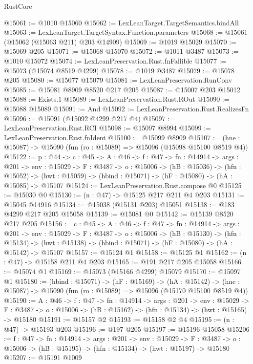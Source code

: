 \begin{lexlean}{RustCore}
\begin{coremodule}
@15061 := @1010 @15060
@15062 := LexLeanTarget.TargetSemantics.bindAll
@15063 := LexLeanTarget.TargetSyntax.Function.parameters
@15068 := @15061 (@15062 (@15063 @211) @203 @14909)
@15069 := @1019 @15029
@15070 := @15069 @205
@15071 := @15068 @15070
@15072 := @1011 @3487
@15073 := @1010 @15072
@15074 := LexLeanPreservation.Rust.fnFallible
@15077 := @15073 (@15074 @8519 @4299)
@15078 := @1019 @3487
@15079 := @15078 @205
@15080 := @15077 @15079
@15081 := LexLeanPreservation.RunConv
@15085 := @15081 @8909 @8520 @217 @205
@15087 := @15007 @203 @15012
@15088 := Exists.{1}
@15089 := LexLeanPreservation.Rust.ROut
@15090 := @15088 @15089
@15091 := And
@15092 := LexLeanPreservation.Rust.RealizesFn
@15096 := @15091 (@15092 @4299 @217 @4)
@15097 := LexLeanPreservation.Rust.RCI
@15098 := @15097 @8994
@15099 := LexLeanPreservation.Rust.fnIdent
@15100 := @15099 @8909
@15107 := (hne : @15087) -> @15090 (fun (ro : @15089) => @15096 (@15098 @15100 @8519 @4))
@15122 := {p : @44} ->
  {c : @45} ->
  {A : @46} ->
  {f : @47} ->
  {fn : @14914} ->
  {args : @201} ->
  {env : @15029} ->
  {F : @3487} ->
  {o : @15006} ->
  (hB : @15036) ->
  (hfn : @15052) -> (hwt : @15059) -> (hbind : @15071) -> (hF : @15080) -> (hA : @15085) -> @15107
@15124 := LexLeanPreservation.Rust.compose @0
@15125 := @15030 @0
@15130 := (n : @47) -> @15125 @217 @211 @4 @203
@15131 := @15045 @14916
@15134 := @15038 (@15131 @203) @15051
@15138 := @183 @4299 @217 @205 @15058
@15139 := @15081 @0
@15142 := @15139 @8520 @217 @205
@15156 := {c : @45} ->
  {A : @46} ->
  {f : @47} ->
  {fn : @14914} ->
  {args : @201} ->
  {env : @15029} ->
  {F : @3487} ->
  {o : @15006} ->
  (hB : @15130) ->
  (hfn : @15134) -> (hwt : @15138) -> (hbind : @15071) -> (hF : @15080) -> (hA : @15142) -> @15107
@15157 := @15124 @1
@15158 := @15125 @1
@15162 := (n : @47) -> @15158 @211 @4 @203
@15165 := @191 @217 @205 @15058
@15166 := @15074 @1
@15169 := @15073 (@15166 @4299) @15079
@15170 := @15097 @1
@15180 := (hbind : @15071) ->
  (hF : @15169) ->
  (hA : @15142) -> (hne : @15087) -> @15090 (fun (ro : @15089) => @15096 (@15170 @15100 @8519 @4))
@15190 := {A : @46} ->
  {f : @47} ->
  {fn : @14914} ->
  {args : @201} ->
  {env : @15029} ->
  {F : @3487} -> {o : @15006} -> (hB : @15162) -> (hfn : @15134) -> (hwt : @15165) -> @15180
@15191 := @15157 @2
@15193 := @15158 @2 @4
@15195 := (n : @47) -> @15193 @203
@15196 := @197 @205
@15197 := @15196 @15058
@15206 := {f : @47} ->
  {fn : @14914} ->
  {args : @201} ->
  {env : @15029} ->
  {F : @3487} -> {o : @15006} -> (hB : @15195) -> (hfn : @15134) -> (hwt : @15197) -> @15180
@15207 := @15191 @1009

\end{coremodule}
\end{lexlean}
